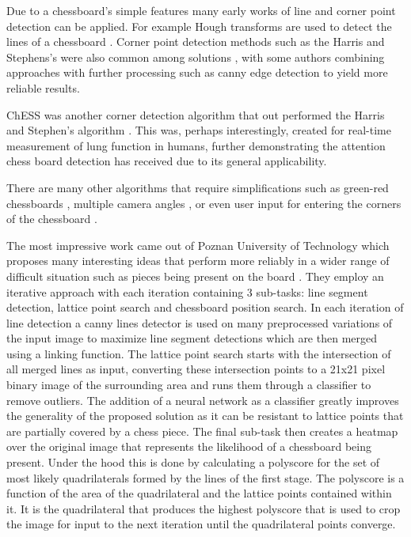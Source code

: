 Due to a chessboard's simple features many early works of line and corner point detection can be applied.  For example Hough 
transforms \cite{} are used to detect the lines of a chessboard \cite{}.  Corner point detection methods such as the 
Harris and Stephens's \cite{} were also common among solutions \cite{}, with some authors combining approaches with further 
processing such as canny edge detection \cite{} to yield more reliable results.

ChESS was another corner detection algorithm that out performed the Harris and Stephen's algorithm \cite{}. This was, perhaps 
interestingly, created for real-time measurement of lung function in humans, further demonstrating the attention chess board
detection has received due to its general applicability.

There are many other algorithms that require simplifications such as green-red chessboards \cite{}, multiple camera angles \cite{}, 
or even user input for entering the corners of the chessboard \cite{}.

The most impressive work came out of Poznan University of Technology which proposes many interesting ideas that perform more 
reliably in a wider range of difficult situation such as pieces being present on the board \cite{}.  They employ an iterative 
approach with each iteration containing 3 sub-tasks: line segment detection, lattice point search and chessboard position search.
In each iteration of line detection a canny lines detector \cite{} is used on many preprocessed variations of the input image 
to maximize line segment detections which are then merged using a linking function. The lattice point search starts with 
the intersection of all merged lines as input, converting these intersection points to a 21x21 pixel binary image of the surrounding area and 
runs them through a classifier to remove outliers.  The addition of a neural network as a classifier greatly improves 
the generality of the proposed solution as it can be resistant to lattice points that are partially covered by a chess piece.
The final sub-task then creates a heatmap over the original image that represents the likelihood of a chessboard being present.  
Under the hood this is done by calculating a polyscore for the set of most likely quadrilaterals formed by the lines of the first stage.
The polyscore is a function of the area of the quadrilateral and the lattice points contained within it.
It is the quadrilateral that produces the highest polyscore that is used to crop the image for input to the next iteration until the quadrilateral
points converge.  

